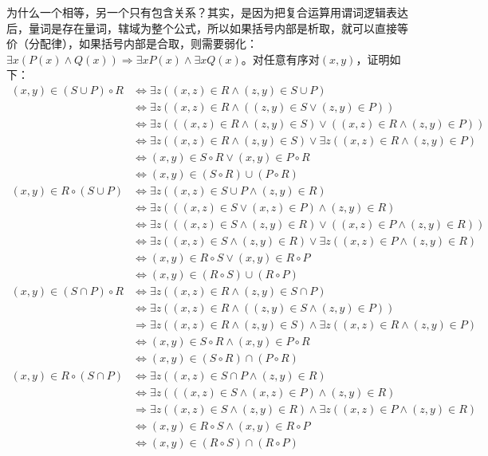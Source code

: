 \documentclass[lang=cn,11pt]{elegantbook}
\begin{document}
为什么一个相等，另一个只有包含关系？其实，是因为把复合运算用谓词逻辑表达后，量词是存在量词，辖域为整个公式，所以如果括号内部是析取，就可以直接等价（分配律），如果括号内部是合取，则需要弱化：$\exists x(P(x) \land Q(x))\Rightarrow \exists xP(x)\land \exists xQ(x)$。对任意有序对$(x,y)$，证明如下：
\begin{align*}
(x,y)\in(S\cup P)\circ R &\Leftrightarrow \exists z((x,z)\in R\land(z,y)\in S\cup P)\\
&\Leftrightarrow \exists z((x,z)\in R\land((z,y)\in S\lor (z,y)\in P))\\
&\Leftrightarrow \exists z(((x,z)\in R\land(z,y)\in S)\lor((x,z)\in R\land(z,y)\in P))\\
&\Leftrightarrow \exists z((x,z)\in R\land(z,y)\in S)\lor \exists z((x,z)\in R\land(z,y)\in P)\\
&\Leftrightarrow (x,y)\in S\circ R\lor (x,y)\in P\circ R\\
&\Leftrightarrow (x,y)\in (S\circ R)\cup(P\circ R)\\
(x,y)\in R\circ(S\cup P) &\Leftrightarrow \exists z((x,z)\in S\cup P\land(z,y)\in R)\\
&\Leftrightarrow \exists z(((x,z)\in S\lor(x,z)\in P)\land(z,y)\in R)\\
&\Leftrightarrow \exists z(((x,z)\in S\land(z,y)\in R)\lor((x,z)\in P\land(z,y)\in R))\\
&\Leftrightarrow \exists z((x,z)\in S\land(z,y)\in R)\lor\exists z((x,z)\in P\land(z,y)\in R)\\
&\Leftrightarrow (x,y)\in R\circ S\lor(x,y)\in R\circ P\\
&\Leftrightarrow (x,y)\in (R\circ S)\cup(R\circ P)\\
(x,y)\in(S\cap P)\circ R &\Leftrightarrow \exists z((x,z)\in R\land(z,y)\in S\cap P)\\
&\Leftrightarrow \exists z((x,z)\in R\land((z,y)\in S\land(z,y)\in P))\\
&\Rightarrow \exists z((x,z)\in R\land(z,y)\in S)\land\exists z((x,z)\in R\land(z,y)\in P)\\
&\Leftrightarrow (x,y)\in S\circ R\land(x,y)\in P\circ R\\
&\Leftrightarrow (x,y)\in (S\circ R)\cap(P\circ R)\\
(x,y)\in R\circ(S\cap P) &\Leftrightarrow \exists z((x,z)\in S\cap P\land(z,y)\in R)\\
&\Leftrightarrow \exists z(((x,z)\in S\land(x,z)\in P)\land(z,y)\in R)\\
&\Rightarrow \exists z((x,z)\in S\land(z,y)\in R)\land\exists z((x,z)\in P\land(z,y)\in R)\\
&\Leftrightarrow (x,y)\in R\circ S\land(x,y)\in R\circ P\\
&\Leftrightarrow (x,y)\in (R\circ S)\cap(R\circ P)
\end{align*}
\end{document}
